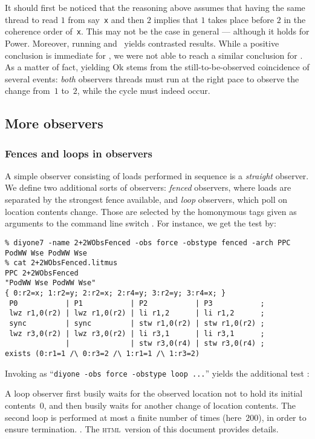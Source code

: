 It should first be noticed that the reasoning above assumes
that having the same thread to read $1$ from say~\texttt{x}
and then $2$ implies that $1$ takes place before $2$
in the coherence order of~\texttt{x}.
This may not be the case in general --- although it holds for Power.
Moreover, running  and~
yields contrasted results. While a positive conclusion is
immediate for , we were not able to reach a similar conclusion
for .
As a matter of fact,  yielding Ok stems from the
still-to-be-observed coincidence
of several events: \emph{both} observers threads must run at the right pace to
observe the change from~$1$ to~$2$, while the cycle must indeed occur.

\subsection{More\label{sec:obstype} observers}

\subsubsection{Fences and loops in observers}
A simple observer consisting of loads performed in sequence is a
\emph{straight} observer. We define two additional sorts of observers:
\emph{fenced} observers, where loads are separated by the strongest fence
available, and \emph{loop} observers, which poll on location contents change.
Those are selected by the homonymous tags given as arguments to the command
line switch . For instance, we get the test
 by:
\begin{verbatim}
% diyone7 -name 2+2WObsFenced -obs force -obstype fenced -arch PPC PodWW Wse PodWW Wse
% cat 2+2WObsFenced.litmus
PPC 2+2WObsFenced
"PodWW Wse PodWW Wse"
{ 0:r2=x; 1:r2=y; 2:r2=x; 2:r4=y; 3:r2=y; 3:r4=x; }
 P0           | P1           | P2           | P3           ;
 lwz r1,0(r2) | lwz r1,0(r2) | li r1,2      | li r1,2      ;
 sync         | sync         | stw r1,0(r2) | stw r1,0(r2) ;
 lwz r3,0(r2) | lwz r3,0(r2) | li r3,1      | li r3,1      ;
              |              | stw r3,0(r4) | stw r3,0(r4) ;
exists (0:r1=1 /\ 0:r3=2 /\ 1:r1=1 /\ 1:r3=2)
\end{verbatim}
Invoking \diyone{} as ``\verb+diyone -obs force -obstype loop ...+''
yields the additional  test \ifhevea:

A loop observer first busily waits for the observed location not
to hold its initial contents~$0$, and then busily waits for another change
of location contents.
The second loop is performed at most a finite number of times
(here~$200$), in order to ensure termination.
\else.
The \textsc{html}~version of this document provides details.
\fi

